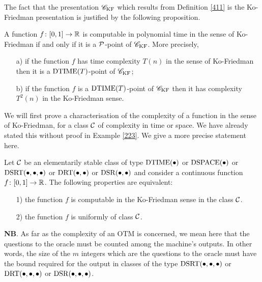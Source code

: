 The fact that the presentation ${{{\mathscr C}}_{\rm KF}}$ which results from Definition \ref{411} is the Ko-Friedman presentation is justified by the following proposition. 


\begin{proposition} \label{414}
A function $f\colon [0,1] \to \mathbb {R}$ is computable in polynomial time in the sense of Ko-Friedman if and only if it is a ${\cal P}$-point of ${{{\mathscr C}}_{\rm KF}}$. More 
precisely,
\begin{itemize}
%
\item [a)] if the function $f$ has time complexity $T(n)$ in the sense of Ko-Friedman then it is a ${\rm DTIME} (T)$-point of ${{{\mathscr C}}_{\rm KF}}$;
%
\item [b)] if the function $f$ is a ${\rm DTIME} (T)$-point of ${{{\mathscr C}}_{\rm KF}}$ then it has complexity $T^2(n)$ in the Ko-Friedman sense. 
%
\end{itemize}
\end{proposition}
We will first prove a characterisation of the complexity of a function in the sense of Ko-Friedman, for a class ${{\cal C}}$ of complexity in time or space. We have already stated this without proof in  Example  \ref{223}. We give a more precise statement here.

\begin{proposition} \label{415}
Let ${{\cal C}}$ be an elementarily stable class of type ${\rm DTIME}(\bullet)$ 
or ${\rm DSPACE}(\bullet)$ or ${\rm DSRT}(\bullet, \bullet, \bullet)$ or ${\rm DRT}(\bullet, 
\bullet)$ or ${\rm DSR}(\bullet, \bullet)$ and consider a continuous function 
$f\colon [0,1] \to \mathbb {R}$. The following properties are equivalent:
\begin{itemize}
%
\item  [1)] the function $f$ is computable in the Ko-Friedman sense in the class ${{\cal C}}$.
%
\item  [2)] the function $f$ is uniformly of class ${{\cal C}}$.
%
\end{itemize}
{\bf NB}. 
As far as the complexity of an OTM is concerned, we mean here that the questions to the oracle must be counted among the machine's outputs. 
In other words, the size of the $m$ integers which are the questions to the oracle must have the bound required for the output in classes of the type ${\rm DSRT}(\bullet, \bullet, \bullet)$ or ${\rm DRT}(\bullet, \bullet, \bullet)$ or ${\rm DSR}(\bullet, \bullet, \bullet)$.
\end{proposition}

